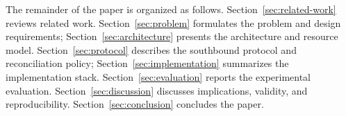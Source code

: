 The remainder of the paper is organized as follows. Section~\ref{sec:related-work} reviews related work. Section~\ref{sec:problem} formulates the problem and design requirements; Section~\ref{sec:architecture} presents the architecture and resource model. Section~\ref{sec:protocol} describes the southbound protocol and reconciliation policy; Section~\ref{sec:implementation} summarizes the implementation stack. Section~\ref{sec:evaluation} reports the experimental evaluation. Section~\ref{sec:discussion} discusses implications, validity, and reproducibility. Section~\ref{sec:conclusion} concludes the paper.
